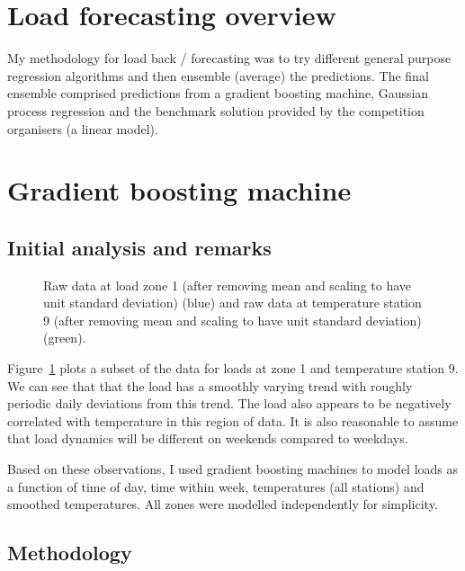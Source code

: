 \documentclass[preprint,authoryear,12pt]{elsarticle}
\begin{document}
\section{Load forecasting overview}

My methodology for load back / forecasting was to try different general purpose regression algorithms and then ensemble (average) the predictions.
The final ensemble comprised predictions from a gradient boosting machine, Gaussian process regression and the benchmark solution provided by the competition organisers (a linear model).

\section{Gradient boosting machine}

\subsection{Initial analysis and remarks}

\label{sec:gbm_init_anal}

\begin{figure}[ht]
  \begin{center}
    
  \end{center}
  \caption{Raw data at load zone 1 (after removing mean and scaling to have unit standard deviation) (blue) and raw data at temperature station 9 (after removing mean and scaling to have unit standard deviation) (green).}
  \label{fig:load_temp}
\end{figure}

Figure~\ref{fig:load_temp} plots a subset of the data for loads at zone 1 and temperature station 9.
We can see that that the load has a smoothly varying trend with roughly periodic daily deviations from this trend.
The load also appears to be negatively correlated with temperature in this region of data.
It is also reasonable to assume that load dynamics will be different on weekends compared to weekdays.

Based on these observations, I used gradient boosting machines to model loads as a function of time of day, time within week, temperatures (all stations) and smoothed temperatures.
All zones were modelled independently for simplicity.

\subsection{Methodology}
\end{document}
